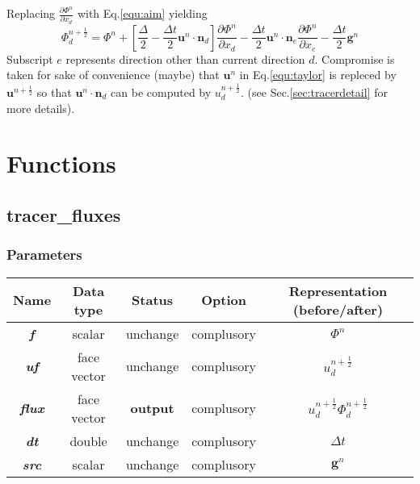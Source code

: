 \documentclass[a4paper]{article}
\newcommand{\func}[1]{\textbf{\textcolor{function}{#1}}}
\newcommand{\para}[1]{\textbf{\emph{\textcolor{para}{#1}}}}
\begin{document}
Replacing $ \frac{\partial \Phi^n}{\partial x_d}$ with Eq.\ref{equ:aim} yielding 
\begin{equation}
  \Phi^{n+ \frac{1}{2}}_d = \Phi^n + [\frac{\Delta}{2}- \frac{\Delta t}{2} \mathbf{u}^n \cdot \mathbf{n}_d] \frac{\partial \Phi^n}{\partial x_d} - \frac{\Delta t}{2} \mathbf{u}^n\cdot \mathbf{n}_e \frac{\partial \Phi^n}{\partial x_e} - \frac{\Delta t}{2} \mathbf{g}^n \label{equ:taylor}
\end{equation}
Subscript $e$ represents direction other than current direction $d$.
Compromise is taken for sake of convenience (maybe) that $ \mathbf{u}^n$ in Eq.\ref{equ:taylor} is repleced by $ \mathbf{u}^{n + \frac{1}{2}}$ so that $ \mathbf{u}^n\cdot \mathbf{n}_d$ can be computed by $u_d^{n + \frac{1}{2}}$. (see Sec.\ref{sec:tracerdetail} for more details).
\section{Functions}

\subsection{\func{tracer\_fluxes}}

\subsubsection{Parameters}
\begin{center}
  \begin{tabular}{|c|c|c|c|c|}
    \hline
    Name & Data type & Status & Option & Representation (before/after)\\[0.5ex]
    \hline\hline
    \para{f} & scalar & unchange & complusory & $\Phi^n$\\
    \hline
    \para{uf} & face vector & unchange & complusory & $u_d^{n+ \frac{1}{2}}$\\
    \hline
    \rowcolor{output} \para{flux} & face vector & \textbf{output} & complusory & $u_d^{n+ \frac{1}{2}}\Phi_d^{n+\frac{1}{2}}$\\
    \hline
    \para{dt} & double & unchange & complusory & $\Delta t$\\
    \hline
    \para{src} & scalar & unchange & complusory & $ \mathbf{g}^n$ \\
    \hline
  \end{tabular}
\end{center}
\end{document}

